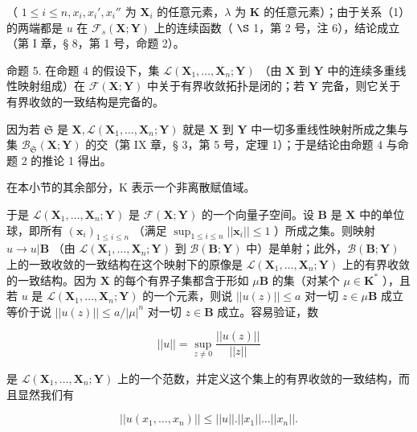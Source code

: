 （ \(1 \leqslant i \leqslant n, x_i, x_i', x_i''\) 为 \(\mathbf{X}_i\) 的任意元素，\(\lambda\) 为 \(\mathbf{K}\) 的任意元素）；由于关系（1）的两端都是 \(u\) 在 \(\mathcal{F}_s(\mathbf{X}; \mathbf{Y})\) 上的连续函数（ \(\S\) 1，第 2 号，注 6），结论成立（第 I 章，§ 8，第 1 号，命题 2）。

命题 5. 在命题 4 的假设下，集 \(\mathcal{L}(\mathbf{X}_1,\ldots ,\mathbf{X}_n;\mathbf{Y})\) （由 \(\mathbf{X}\) 到 \(\mathbf{Y}\) 中的连续多重线性映射组成）在 \(\mathcal{F}(\mathbf{X};\mathbf{Y})\) 中关于有界收敛拓扑是闭的；若 \(\mathbf{Y}\) 完备，则它关于有界收敛的一致结构是完备的。

因为若 \(\mathfrak{S}\) 是 \(\mathbf{X},\mathcal{L}(\mathbf{X}_1,\ldots ,\mathbf{X}_n;\mathbf{Y})\) 就是 \(\mathbf{X}\) 到 \(\mathbf{Y}\) 中一切多重线性映射所成之集与集 \(\mathcal{B}_{\mathfrak{S}}(\mathbf{X};\mathbf{Y})\) 的交（第 IX 章，§ 3，第 5 号，定理 1）；于是结论由命题 4 与命题 2 的推论 1 得出。

在本小节的其余部分，K 表示一个非离散赋值域。

于是 \(\mathcal{L}(\mathbf{X}_1, \ldots, \mathbf{X}_n; \mathbf{Y})\) 是 \(\mathcal{F}(\mathbf{X}; \mathbf{Y})\) 的一个向量子空间。设 \(\mathbf{B}\) 是 \(\mathbf{X}\) 中的单位球，即所有 \((\boldsymbol{x}_i)_{1 \leqslant i \leqslant n}\) （满足 \(\sup_{1 \leqslant i \leqslant n} ||\boldsymbol{x}_i|| \leqslant 1\) ）所成之集。则映射 \(u \to u|\mathbf{B}\) （由 \(\mathcal{L}(\mathbf{X}_1, \ldots, \mathbf{X}_n; \mathbf{Y})\) 到 \(\mathcal{B}(\mathbf{B}; \mathbf{Y})\) 中）是单射；此外，\(\mathcal{B}(\mathbf{B}; \mathbf{Y})\) 上的一致收敛的一致结构在这个映射下的原像是 \(\mathcal{L}(\mathbf{X}_1, \ldots, \mathbf{X}_n; \mathbf{Y})\) 上的有界收敛的一致结构。因为 \(\mathbf{X}\) 的每个有界子集都含于形如 \(\mu\mathbf{B}\) 的集（对某个 \(\mu \in \mathbf{K}^*\) ），且若 \(u\) 是 \(\mathcal{L}(\mathbf{X}_1, \ldots, \mathbf{X}_n; \mathbf{Y})\) 的一个元素，则说 \(||u(z)|| \leqslant a\) 对一切 \(z \in \mu\mathbf{B}\) 成立等价于说 \(||u(z)|| \leqslant a/|\mu|^n\) 对一切 \(z \in \mathbf{B}\) 成立。容易验证，数

\[
\left| \left| u \right| \right| = \sup _ {z \neq 0} \frac {\left| \left| u (z) \right| \right|}{\left| \left| z \right| \right|}
\]

是 \(\mathcal{L}(\mathbf{X}_1, \ldots, \mathbf{X}_n; \mathbf{Y})\) 上的一个范数，并定义这个集上的有界收敛的一致结构，而且显然我们有

\[
\left| \left| u \left(x _ {1}, \dots , x _ {n}\right) \right| \right| \leqslant \left| \left| u \right| \right|. \left| \left| x _ {1} \right| \right| \dots \left| \left| x _ {n} \right| \right|.\tag{2}
\]

